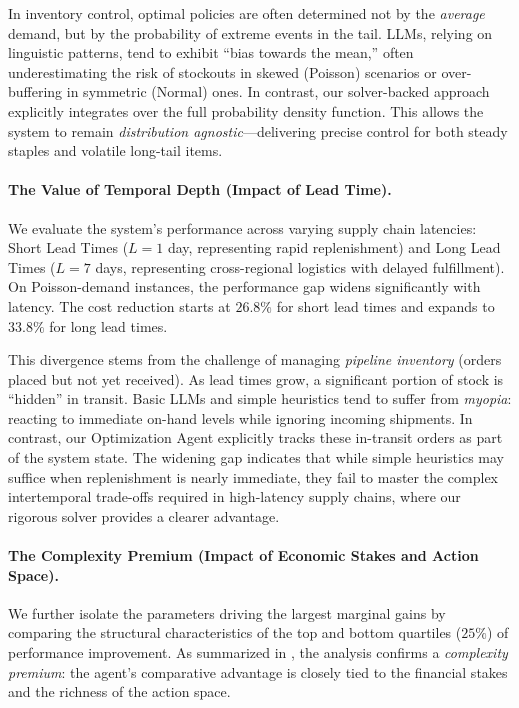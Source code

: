 In inventory control, optimal policies are often determined not by the \emph{average} demand, but by the probability of extreme events in the tail. LLMs, relying on linguistic patterns, tend to exhibit ``bias towards the mean,'' often underestimating the risk of stockouts in skewed (Poisson) scenarios or over-buffering in symmetric (Normal) ones. In contrast, our solver-backed approach explicitly integrates over the full probability density function. This allows the system to remain \emph{distribution agnostic}—delivering precise control for both steady staples and volatile long-tail items. \vspace{.5em}


\paragraph{The Value of Temporal Depth (Impact of Lead Time).}
We evaluate the system's performance across varying supply chain latencies: {Short Lead Times} ($L=1$ day, representing rapid replenishment) and {Long Lead Times} ($L=7$ days, representing cross-regional logistics with delayed fulfillment).
%
On Poisson-demand instances, the performance gap widens significantly with latency. The cost reduction starts at $26.8\%$ for short lead times and expands to $33.8\%$ for long lead times. 

This divergence stems from the challenge of managing \emph{pipeline inventory} (orders placed but not yet received). As lead times grow, a significant portion of stock is ``hidden'' in transit. Basic LLMs and simple heuristics tend to suffer from \emph{myopia}: reacting to immediate on-hand levels while ignoring incoming shipments. In contrast, our Optimization Agent explicitly tracks these in-transit orders as part of the system state. The widening gap indicates that while simple heuristics may suffice when replenishment is nearly immediate, they fail to master the complex intertemporal trade-offs required in high-latency supply chains, where our rigorous solver provides a clearer advantage.  \vspace{.5em}



\paragraph{The Complexity Premium (Impact of Economic Stakes and Action Space).}

We further isolate the parameters driving the largest marginal gains by comparing the structural characteristics of the top and bottom quartiles ($25\%$) of performance improvement. As summarized in , the analysis confirms a \emph{complexity premium}: the agent's comparative advantage is closely tied to the financial stakes and the richness of the action space.

